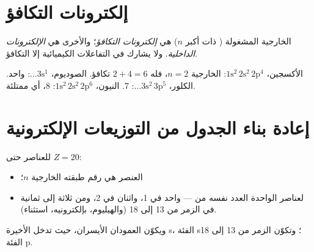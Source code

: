 \section{إلكترونات التكافؤ}

\begin{definition}\label{def:g10:electron-shells:valence}
  الخارجية المشغولة ( ذات أكبر $n$) هي
\emph{إلكترونات التكافؤ}؛ والأخرى هي
\emph{الإلكترونات الداخلية}. ولا يشارك في التفاعلات
الكيميائية إلا  التكافؤ.
\end{definition}

\begin{example}\label{ex:g10:electron-shells:count}
الأكسجين، $1\mathrm{s}^2\,2\mathrm{s}^2\,2\mathrm{p}^4$:  الخارجية $n =
2$، فله $2 + 4 = 6$  تكافؤ. الصوديوم، $\ldots 3\mathrm{s}^1$:
 واحد. الكلور، $\ldots 3\mathrm{s}^2\,3\mathrm{p}^5$: 7.
النيون، $1\mathrm{s}^2\,2\mathrm{s}^2\,2\mathrm{p}^6$: 8، أي  ممتلئة.
\end{example}

\section{إعادة بناء الجدول من التوزيعات الإلكترونية}

\begin{proposition}\label{prop:g10:electron-shells:table}
للعناصر حتى $Z = 20$:
\begin{itemize}
  \item {} العنصر هي رقم طبقته الخارجية $n$؛
  \item لعناصر  الواحدة العدد نفسه من  ---
        واحد في  1، واثنان في  2، ومن ثلاثة إلى ثمانية في
        الزمر من 13 إلى 18 (والهيليوم، بإلكترونيه، استثناء).
\end{itemize}
ويكوّن العمودان الأيسران، حيث تدخل  الأخيرة  s، الفئة
s؛ وتكوّن الزمر من 13 إلى 18 الفئة p.
\end{proposition}

